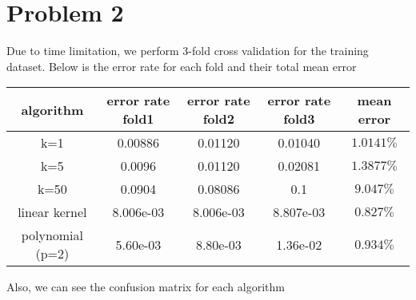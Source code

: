 \documentclass{article}
\begin{document}
\section{Problem 2}
Due to time limitation, we perform 3-fold cross validation for the training dataset. Below is the error rate for each fold and their total mean error
\begin{table}[H]
	\centering
	\begin{tabular}{c|c|c|c|c}
		\hline
		algorithm&error rate fold1 &error rate fold2 &error rate fold3&mean error\\
		\hline
		k=1&0.00886 &0.01120& 0.01040&$ 1.0141\%$\\
		\hline
		k=5& 0.0096& 0.01120& 0.02081&$ 1.3877\%$\\
		\hline
		k=50&0.0904& 0.08086& 0.1& $9.047\%$\\
		\hline
		\hline
		linear kernel& 8.006e-03& 8.006e-03& 8.807e-03&$0.827\%$\\
		\hline
		polynomial (p=2)&5.60e-03& 8.80e-03& 1.36e-02& $0.934\%$\\
		\hline
		\hline
	\end{tabular}
\end{table}
Also, we can see the confusion matrix for each algorithm 
\end{document}
